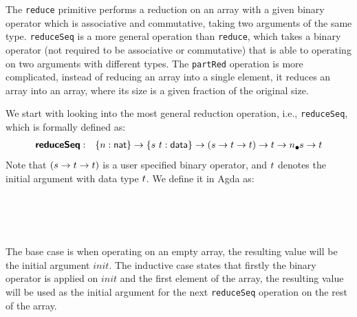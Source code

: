 \documentclass{l4proj}
\begin{document}
The \texttt{reduce} primitive performs a reduction on an array with a given binary operator which is associative and commutative, taking two arguments of the same type. \texttt{reduceSeq} is a more general operation than \texttt{reduce}, which takes a binary operator (not required to be associative or commutative) that is able to operating on two arguments with different types. The \texttt{partRed} operation is more complicated, instead of reducing an array into a single element, it reduces an array into an array, where its size is a given fraction of the original size.

We start with looking into the most general reduction operation, i.e., \texttt{reduceSeq}, which is formally defined as:
\begin{align}
    \label{lift:reduceSeq}
    \prim{reduceSeq}&:&\{\n : \natkind\} \to \{\dtone~\dttwo : \datatype\} \to (\dtone \to \dttwo \to \dttwo) \to \dttwo \to \lArray{\n}{\dtone} \to \dttwo
\end{align}
Note that $(s \to t \to t)$ is a user specified binary operator, and $t $ denotes the initial argument with data type $t$. We define it in Agda as:
\begin{code}%
\>[0]\<%
\\
\>[0]\AgdaSpace{}%
\AgdaSymbol{:}\AgdaSpace{}%
\AgdaSymbol{\{}\AgdaSpace{}%
\AgdaSymbol{:}\AgdaSpace{}%
\AgdaSymbol{\}}\AgdaSpace{}%
\AgdaSpace{}%
\AgdaSymbol{\{}\AgdaSpace{}%
\AgdaSpace{}%
\AgdaSymbol{:}\AgdaSpace{}%
\AgdaSymbol{\}}\AgdaSpace{}%
\AgdaSpace{}%
\AgdaSymbol{(}\AgdaSpace{}%
\AgdaSpace{}%
\AgdaSpace{}%
\AgdaSpace{}%
\AgdaSymbol{)}\AgdaSpace{}%
\AgdaSpace{}%
\AgdaSpace{}%
\AgdaSpace{}%
\AgdaSpace{}%
\AgdaSpace{}%
\AgdaSpace{}%
\AgdaSpace{}%
\<%
\\
\>[0]\AgdaSpace{}%
\AgdaSpace{}%
\AgdaSpace{}%
\AgdaInductiveConstructor{[]}\AgdaSpace{}%
\AgdaSymbol{=}\AgdaSpace{}%
\<%
\\
\>[0]\AgdaSpace{}%
\AgdaSpace{}%
\AgdaSpace{}%
\AgdaSymbol{(}\AgdaSpace{}%
\AgdaSpace{}%
\AgdaSymbol{)}\AgdaSpace{}%
\AgdaSymbol{=}\AgdaSpace{}%
\AgdaSpace{}%
\AgdaSpace{}%
\AgdaSymbol{(}\AgdaSpace{}%
\AgdaSpace{}%
\AgdaSymbol{)}\AgdaSpace{}%
\<%
\end{code}
The base case is when operating on an empty array, the resulting value will be the initial argument $init$. The inductive case states that firstly the binary operator is applied on $init$ and the first element of the array, the resulting value will be used as the initial argument for the next \texttt{reduceSeq} operation on the rest of the array.
\end{document}
